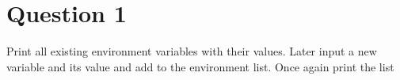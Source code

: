 \documentclass[main.tex]{subfiles}
\begin{document}
\section{Question 1}
Print all existing environment variables with their values. Later input a new variable and its value and add to the environment list. Once again print the list




\end{document}
